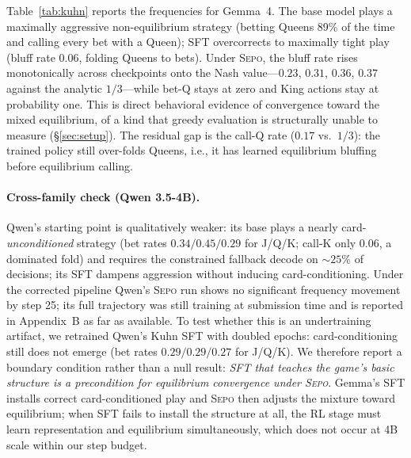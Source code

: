 \documentclass[letterpaper]{article} %
\newcommand{\sepo}{\textsc{Sepo}}
\begin{document}
Table~\ref{tab:kuhn} reports the frequencies for Gemma~4. The base model plays a maximally aggressive non-equilibrium strategy (betting Queens 89\% of the time and calling every bet with a Queen); SFT overcorrects to maximally tight play (bluff rate 0.06, folding Queens to bets). Under \sepo{}, the bluff rate rises monotonically across checkpoints onto the Nash value---$0.23$, $0.31$, $0.36$, $0.37$ against the analytic $1/3$---while bet-Q stays at zero and King actions stay at probability one. This is direct behavioral evidence of convergence toward the mixed equilibrium, of a kind that greedy evaluation is structurally unable to measure (\S\ref{sec:setup}). The residual gap is the call-Q rate ($0.17$ vs.\ $1/3$): the trained policy still over-folds Queens, i.e., it has learned equilibrium bluffing before equilibrium calling.
\paragraph{Cross-family check (Qwen 3.5-4B).} Qwen's starting point is qualitatively weaker: its base plays a nearly card-\emph{unconditioned} strategy (bet rates $0.34/0.45/0.29$ for J/Q/K; call-K only $0.06$, a dominated fold) and requires the constrained fallback decode on ${\sim}25\%$ of decisions; its SFT dampens aggression without inducing card-conditioning. Under the corrected pipeline Qwen's \sepo{} run shows no significant frequency movement by step 25; its full trajectory was still training at submission time and is reported in Appendix~B as far as available. To test whether this is an undertraining artifact, we retrained Qwen's Kuhn SFT with doubled epochs: card-conditioning still does not emerge (bet rates $0.29/0.29/0.27$ for J/Q/K). We therefore report a boundary condition rather than a null result: \emph{SFT that teaches the game's basic structure is a precondition for equilibrium convergence under \sepo{}}. Gemma's SFT installs correct card-conditioned play and \sepo{} then adjusts the mixture toward equilibrium; when SFT fails to install the structure at all, the RL stage must learn representation and equilibrium simultaneously, which does not occur at 4B scale within our step budget.
\end{document}
